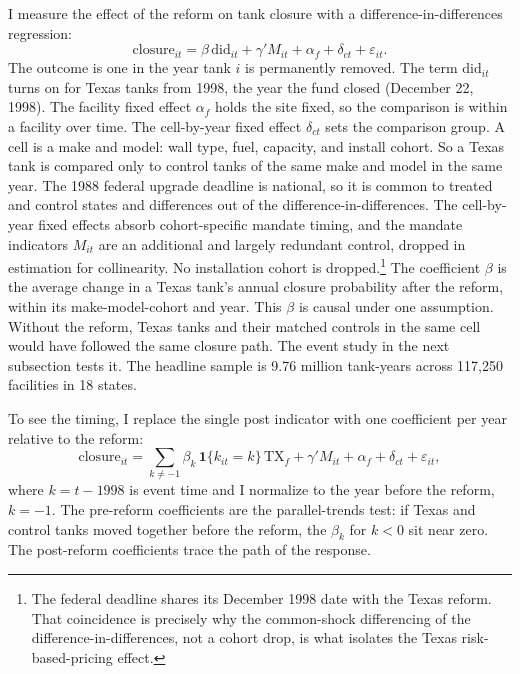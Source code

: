 \documentclass[
  12pt,
]{article}
\begin{document}
I measure the effect of the reform on tank closure with a
difference-in-differences regression:
\[\text{closure}_{it}=\beta\,\text{did}_{it}+\gamma'M_{it}+\alpha_f+\delta_{ct}+\varepsilon_{it}.\]
The outcome is one in the year tank \(i\) is permanently removed. The
term \(\text{did}_{it}\) turns on for Texas tanks from 1998, the year
the fund closed (December 22, 1998). The facility fixed effect
\(\alpha_f\) holds the site fixed, so the comparison is within a
facility over time. The cell-by-year fixed effect \(\delta_{ct}\) sets
the comparison group. A cell is a make and model: wall type, fuel,
capacity, and install cohort. So a Texas tank is compared only to
control tanks of the same make and model in the same year. The 1988
federal upgrade deadline is national, so it is common to treated and
control states and differences out of the difference-in-differences. The
cell-by-year fixed effects absorb cohort-specific mandate timing, and
the mandate indicators \(M_{it}\) are an additional and largely
redundant control, dropped in estimation for collinearity. No
installation cohort is dropped.\footnote{The federal deadline shares its
  December 1998 date with the Texas reform. That coincidence is
  precisely why the common-shock differencing of the
  difference-in-differences, not a cohort drop, is what isolates the
  Texas risk-based-pricing effect.} The coefficient \(\beta\) is the
average change in a Texas tank's annual closure probability after the
reform, within its make-model-cohort and year. This \(\beta\) is causal
under one assumption. Without the reform, Texas tanks and their matched
controls in the same cell would have followed the same closure path. The
event study in the next subsection tests it. The headline sample is 9.76
million tank-years across 117,250 facilities in 18 states.

To see the timing, I replace the single post indicator with one
coefficient per year relative to the reform:
\[\text{closure}_{it}=\sum_{k\ne -1}\beta_k\,\mathbf 1\{k_{it}=k\}\,\text{TX}_f+\gamma'M_{it}+\alpha_f+\delta_{ct}+\varepsilon_{it},\]
where \(k=t-1998\) is event time and I normalize to the year before the
reform, \(k=-1\). The pre-reform coefficients are the parallel-trends
test: if Texas and control tanks moved together before the reform, the
\(\beta_k\) for \(k<0\) sit near zero. The post-reform coefficients
trace the path of the response.
\end{document}
